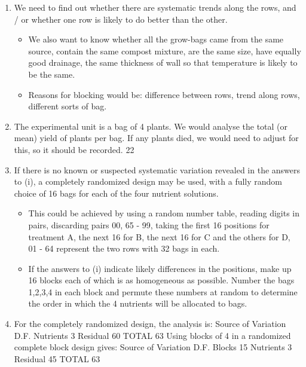 \documentclass[a4paper,12pt]{article}
\begin{document}
\begin{enumerate}
\item We need to find out whether there are systematic trends along the rows, and
/ or whether one row is likely to do better than the other.
\begin{itemize}
\item We also want to know whether all the grow-bags came from the same source,
contain the same compost mixture, are the same size, have equally good
drainage, the same thickness of wall so that temperature is likely to be the
same.
\item Reasons for blocking would be: difference between rows, trend along rows,
different sorts of bag.
\end{itemize}
\item  The experimental unit is a bag of 4 plants. We would analyse the total (or
mean) yield of plants per bag. If any plants died, we would need to adjust
for this, so it should be recorded.
22
\item  If there is no known or suspected systematic variation revealed in the answers
to (i), a completely randomized design may be used, with a fully random
choice of 16 bags for each of the four nutrient solutions. 
\begin{itemize}
\item This could be
achieved by using a random number table, reading digits in pairs, discarding
pairs 00, 65 - 99, taking the first 16 positions for treatment A, the next 16
for B, the next 16 for C and the others for D, 01 - 64 represent the two rows
with 32 bags in each.
\item If the answers to (i) indicate likely differences in the positions, make up 16
blocks each of which is as homogeneous as possible. Number the bags 1,2,3,4
in each block and permute these numbers at random to determine the order
in which the 4 nutrients will be allocated to bags.
\end{itemize}
\item For the completely randomized design, the analysis is:
Source of Variation D.F.
Nutrients 3
Residual 60
TOTAL 63
Using blocks of 4 in a randomized complete block design gives:
Source of Variation D.F.
Blocks 15
Nutrients 3
Residual 45
TOTAL 63

\end{enumerate}
\end{document}
